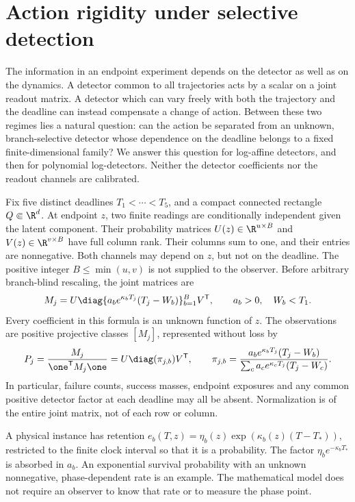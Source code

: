 \section{Action rigidity under selective detection}
\label{sec:v82-main}

The information in an endpoint experiment depends on the detector as
well as on the dynamics. A detector common to all trajectories acts by
a scalar on a joint readout matrix. A detector which can vary freely
with both the trajectory and the deadline can instead compensate a
change of action. Between these two regimes lies a natural question:
can the action be separated from an unknown, branch-selective detector
whose dependence on the deadline belongs to a fixed finite-dimensional
family? We answer this question for log-affine detectors, and then for
polynomial log-detectors. Neither the detector coefficients nor the
readout channels are calibrated.

Fix five distinct deadlines $T_1<\cdots<T_5$, and a compact connected
rectangle $Q\Subset\R^d$. At endpoint $z$, two finite readings are
conditionally independent given the latent component. Their probability
matrices $U(z)\in\R^{u\times B}$ and $V(z)\in\R^{v\times B}$ have
full column rank. Their columns sum to one, and their entries are
nonnegative. Both channels may depend on $z$, but not on the deadline.
The positive integer $B\le\min(u,v)$ is not supplied to the observer.
Before arbitrary branch-blind rescaling, the joint matrices are
\begin{equation}\label{eq:v82-observation}
 M_j=U\diag\{a_b e^{\kappa_bT_j}(T_j-W_b)\}_{b=1}^B V^{\mathsf T},
 \qquad a_b>0,\quad W_b<T_1.
\end{equation}
Every coefficient in this formula is an unknown function of $z$.
The observations are positive projective classes $[M_j]$, represented
without loss by
\begin{equation}\label{eq:v82-normalized}
 P_j=\frac{M_j}{\one^{\mathsf T}M_j\one}
     =U\diag(\pi_{j,b})V^{\mathsf T},\qquad
 \pi_{j,b}=\frac{a_be^{\kappa_bT_j}(T_j-W_b)}
                   {\sum_c a_ce^{\kappa_cT_j}(T_j-W_c)}.
\end{equation}
In particular, failure counts, success masses, endpoint exposures and
any common positive detector factor at each deadline may all be absent.
Normalization is of the entire joint matrix, not of each row or column.

A physical instance has retention
$e_b(T,z)=\eta_b(z)\exp(\kappa_b(z)(T-T_*))$, restricted to the
finite clock interval so that it is a probability. The factor
$\eta_b e^{-\kappa_bT_*}$ is absorbed in $a_b$. An exponential survival
probability with an unknown nonnegative, phase-dependent rate is an
example. The mathematical model does not require an observer to know
that rate or to measure the phase point.

